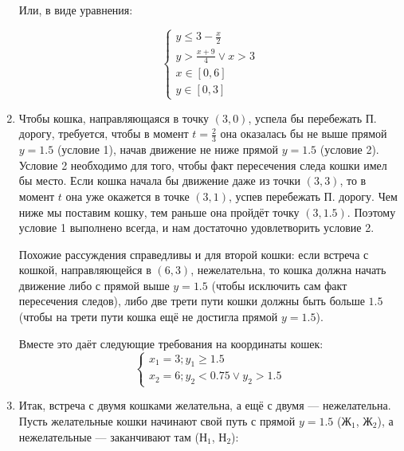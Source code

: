 \begin{enumerate}
Или, в виде уравнения:

$$\left\{\begin{array}{l}y \le 3-\frac{x}{2}\\y > \frac{x+9}{4} \vee x > 3\\x \in [0,6]\\y \in [0,3]\end{array}\right.$$

\item Чтобы кошка, направляющаяся в точку $(3,0)$, успела бы перебежать П.
дорогу, требуется, чтобы в момент $t=\tfrac{2}{3}$ она оказалась бы не выше прямой
$y=1.5$ (условие 1), начав движение не ниже прямой $y=1.5$ (условие 2).
Условие 2 необходимо для того, чтобы факт пересечения следа кошки имел бы место.
Если кошка начала бы движение даже из точки $(3,3)$, то в момент $t$ она 
уже окажется в точке $(3,1)$, успев перебежать П. дорогу. Чем ниже мы поставим 
кошку, тем раньше она пройдёт точку $(3,1.5)$. Поэтому условие 1
выполнено всегда, и нам достаточно удовлетворить условие 2.

Похожие рассуждения справедливы и для второй кошки: если встреча с кошкой, 
направляющейся в $(6,3)$, нежелательна,
то кошка должна начать движение либо с прямой выше $y=1.5$ (чтобы исключить
сам факт пересечения следов), либо две трети пути кошки должны быть больше 
$1.5$ (чтобы на трети пути кошка ещё не достигла прямой $y=1.5$).
                                                              
Вместе это даёт следующие требования на координаты кошек:
$$\left\{\begin{array}{l}x_1 = 3; y_1\ge 1.5\\x_2 = 6; y_2 < 0.75 \vee y_2>1.5\end{array}\right.$$

\item Итак, встреча с двумя кошками желательна, а ещё с двумя --- нежелательна.
Пусть желательные кошки начинают свой путь с прямой $y=1.5$
($\textit{Ж}_1$, $\textit{Ж}_2$), а нежелательные --- заканчивают там
($\textit{Н}_1$, $\textit{Н}_2$):

\begin{center}\end{center}


\end{enumerate}
